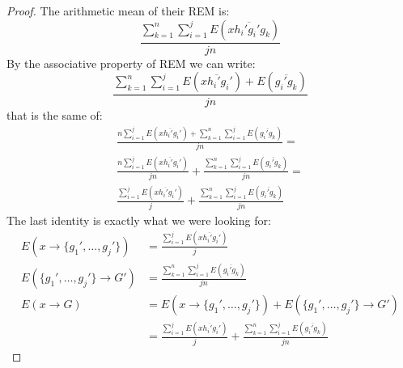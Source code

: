 \documentclass[a4paper]{article}
\begin{document}
\begin{enumerate}
\begin{proof}
			The arithmetic mean of their REM is:
			\[
			\frac{\sum_{k=1}^n \sum_{i=1}^j
			E(\overline{xh_i'g_i'g_k})}{jn}
			\]
			By the associative property of REM we can write:
			\[
			\frac{\sum_{k=1}^n \sum_{i=1}^j
			E(\overline{xh_i'g_i'})+E(\overline{g_i'g_k})}{jn}
			\]
			that is the same of:
			\begin{align*}
			\frac{n\sum_{i=1}^j E(\overline{xh_i'g_i'})+\sum_{k=1}^n \sum_{i=1}^j
			E(\overline{g_i'g_k})}{jn}=\\
			\frac{n\sum_{i=1}^j E(\overline{xh_i'g_i'})}{jn}+\frac{\sum_{k=1}^n \sum_{i=1}^j
                        E(\overline{g_i'g_k})}{jn}=\\
			\frac{\sum_{i=1}^j E(\overline{xh_i'g_i'})}{j}+\frac{\sum_{k=1}^n \sum_{i=1}^j
                        E(\overline{g_i'g_k})}{jn}
			\end{align*}
			The last identity is exactly what we were looking for:
			\begin{align*}
			E(x \rightarrow
			\{g_1',\dots,g_j'\})&=\frac{\sum_{i=1}^j
			E(\overline{xh_i'g_i'})}{j}\\
			E(\{g_1',\dots,g_j'\}\rightarrow
			G')&=\frac{\sum_{k=1}^n
			\sum_{i=1}^jE(\overline{g_i'g_k})}{jn}\\
			E(x\rightarrow G)&=
			E(x \rightarrow \{g_1',\dots,g_j'\}) +
			E(\{g_1',\dots,g_j'\}\rightarrow G')\\
			&= \frac{\sum_{i=1}^j
			E(\overline{xh_i'g_i'})}{j}+\frac{\sum_{k=1}^n
			\sum_{i=1}^jE(\overline{g_i'g_k})}{jn}
			\end{align*}
		\end{proof}
\end{enumerate}
\end{document}
